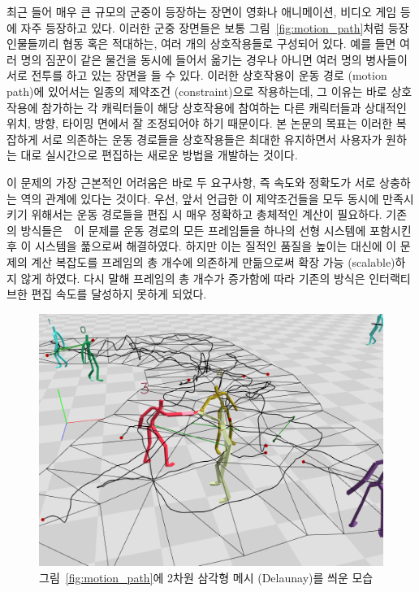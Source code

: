 \documentclass[11pt,a4paper,oneside,draft]{report}
\newcommand{\KimKwon}{\cite{Kim:2009:SMM:1531326.1531385,Kwon:2008:GME:1360612.1360679}}
\begin{document}
최근 들어 매우 큰 규모의 군중이 등장하는 장면이 영화나 애니메이션, 비디오 게임
등에 자주 등장하고 있다. 이러한 군중 장면들은 보통
그림~\ref{fig:motion_path}처럼 등장인물들끼리 협동 혹은 적대하는, 여러 개의
상호작용들로 구성되어 있다.  예를 들면 여러 명의 짐꾼이 같은 물건을 동시에
들어서 옮기는 경우나 아니면 여러 명의 병사들이 서로 전투를 하고 있는 장면을 들
수 있다. 이러한 상호작용이 운동 경로 (motion path)에 있어서는 일종의 제약조건
(constraint)으로 작용하는데, 그 이유는 바로 상호작용에 참가하는 각 캐릭터들이
해당 상호작용에 참여하는 다른 캐릭터들과 상대적인 위치, 방향, 타이밍 면에서 잘
조정되어야 하기 때문이다.  본 논문의 목표는 이러한 복잡하게 서로 의존하는 운동
경로들을 상호작용들은 최대한 유지하면서 사용자가 원하는 대로 실시간으로
편집하는 새로운 방법을 개발하는 것이다.

이 문제의 가장 근본적인 어려움은 바로 두 요구사항, 즉 속도와 정확도가 서로
상충하는 역의 관계에 있다는 것이다. 우선, 앞서 언급한 이 제약조건들을 모두
동시에 만족시키기 위해서는 운동 경로들을 편집 시 매우 정확하고 총체적인 계산이
필요하다.  기존의 방식들은~\KimKwon~이 문제를 운동 경로의 모든 프레임들을
하나의 선형 시스템에 포함시킨 후 이 시스템을 풂으로써 해결하였다. 하지만 이는
질적인 품질을 높이는 대신에 이 문제의 계산 복잡도를 프레임의 총 개수에 의존하게
만듦으로써 확장 가능 (scalable)하지 않게 하였다. 다시 말해 프레임의 총 개수가
증가함에 따라 기존의 방식은 인터랙티브한 편집 속도를 달성하지 못하게 되었다.

\begin{figure}[htb]
\centering
\includegraphics[width=0.9\linewidth]{motion_path_w_mesh_c.png}
\caption{그림~\ref{fig:motion_path}에 2차원 삼각형 메시 (Delaunay)를 씌운 모습}
\label{fig:motion_path_w_mesh}
\end{figure}
 
\end{document}

